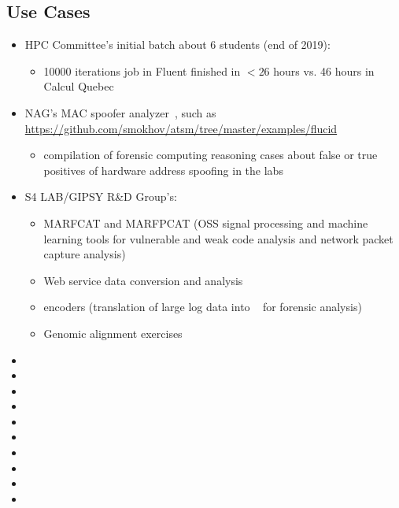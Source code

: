 \documentclass{easychair}
\begin{document}


\subsection{Use Cases}
\label{sect:cases}

\begin{itemize}
	\item 
HPC Committee's initial batch about 6 students (end of 2019):
\begin{itemize}
	\item 
10000 iterations job in Fluent finished in $<26$ hours vs. 46 hours in Calcul Quebec
\end{itemize}
	\item 
NAG's MAC spoofer analyzer~\cite{mac-spoofer-analyzer-intro-c3s2e2014,mac-spoofer-analyzer-detail-fps2014},
such as \url{https://github.com/smokhov/atsm/tree/master/examples/flucid}
\begin{itemize}
	\item 
compilation of forensic computing reasoning cases about false or true positives of hardware address spoofing in the labs
\end{itemize}
	\item 
S4 LAB/GIPSY R\&D Group's:
\begin{itemize}
	\item 
MARFCAT and MARFPCAT (OSS signal processing and machine learning tools for 
vulnerable and weak code analysis and network packet capture
analysis)~\cite{marfcat-nlp-ai2014,marfcat-sate2010-nist,fingerprinting-mal-traffic}
	\item 
Web service data conversion and analysis
	\item 
{\flucid} encoders (translation of large log data into {\flucid}~\cite{mokhov-phd-thesis-2013} for forensic analysis)
	\item 
Genomic alignment exercises
\end{itemize}
\item
{}
\item
{}
\item
{}
\item
{}
\item
{}
\item
{}
\item
{}
\item
{}
\item
{}
\item
{}


\end{itemize}
\end{document}
